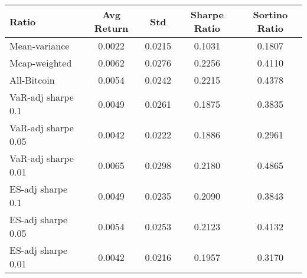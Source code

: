 \begin{tabular}{lcccc}
\toprule
Ratio & Avg Return & Std & Sharpe Ratio & Sortino Ratio\\
\midrule
Mean-variance & 0.0022 & 0.0215 & 0.1031 & 0.1807\\
Mcap-weighted & 0.0062 & 0.0276 & 0.2256 & 0.4110\\
All-Bitcoin & 0.0054 & 0.0242 & 0.2215 & 0.4378\\
VaR-adj sharpe 0.1 & 0.0049 & 0.0261 & 0.1875 & 0.3835\\
VaR-adj sharpe 0.05 & 0.0042 & 0.0222 & 0.1886 & 0.2961\\
VaR-adj sharpe 0.01 & 0.0065 & 0.0298 & 0.2180 & 0.4865\\
ES-adj sharpe 0.1 & 0.0049 & 0.0235 & 0.2090 & 0.3843\\
ES-adj sharpe 0.05 & 0.0054 & 0.0253 & 0.2123 & 0.4132\\
ES-adj sharpe 0.01 & 0.0042 & 0.0216 & 0.1957 & 0.3170\\
\bottomrule
\end{tabular}
